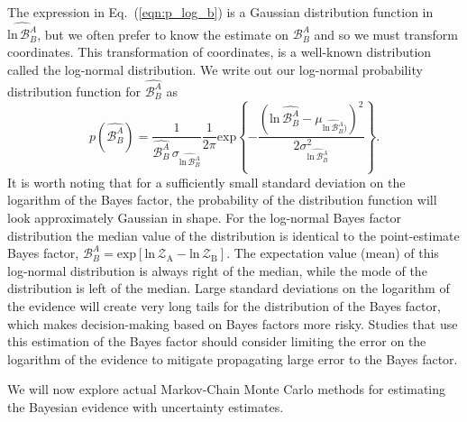 The expression in Eq.~(\ref{eqn:p_log_b}) is a Gaussian distribution function in $\widehat{\mathrm{ln} \, \mathcal{B}^A_B}$, but we often prefer to know the estimate on $\mathcal{B}^A_B$ and so we must transform coordinates. This transformation of coordinates, is a well-known distribution called the log-normal distribution. We write out our log-normal probability distribution function for $\widehat{\mathcal{B}^A_B}$ as
\begin{equation}
    p(\widehat{\mathcal{B}^A_B}) = \frac{1}{\widehat{\mathcal{B}^A_B} \, \sigma_{\widehat{\mathrm{ln} \, \mathcal{B}^A_B}}} \frac{1}{2\pi} \mathrm{exp} \left \{-\frac{\left(\mathrm{ln} \, \widehat{\mathcal{B}^A_B} - \mu_{\widehat{\mathrm{ln} \, \mathcal{B}^A_B})}\right)^2} {2 \sigma^2_{\widehat{\mathrm{ln} \, \mathcal{B}^A_B}}}  \right\}.
\end{equation}
It is worth noting that for a sufficiently small standard deviation on the logarithm of the Bayes factor, the probability of the distribution function will look approximately Gaussian in shape. For the log-normal Bayes factor distribution the median value of the distribution is identical to the point-estimate Bayes factor, $\mathcal{B}^A_B = \mathrm{exp} \left[\mathrm{ln} \, \mathcal{Z}_{\mathrm{A}} - \mathrm{ln} \, \mathcal{Z}_{\mathrm{B}} \right]$. The expectation value (mean) of this log-normal distribution is always right of the median, while the mode of the distribution is left of the median. Large standard deviations on the logarithm of the evidence will create very long tails for the distribution of the Bayes factor, which makes decision-making based on Bayes factors more risky. Studies that use this estimation of the Bayes factor should consider limiting the error on the logarithm of the evidence to mitigate propagating large error to the Bayes factor.

We will now explore actual Markov-Chain Monte Carlo methods for estimating the Bayesian evidence with uncertainty estimates.

